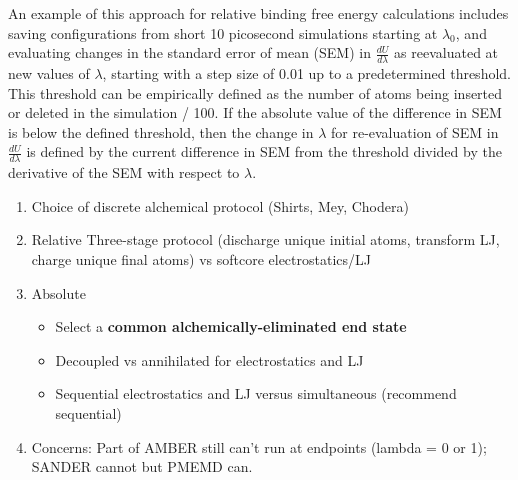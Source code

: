 \documentclass[9pt,bestpractices]{livecoms}
\begin{document}
An example of this approach for relative binding free energy calculations includes saving configurations from short 10 picosecond simulations starting at $\lambda_0$, and evaluating changes in the standard error of mean (SEM) in $\frac{dU}{d\lambda}$ as reevaluated at new values of $\lambda$, starting with a step size of 0.01 up to a predetermined threshold.
This threshold can be empirically defined as the number of atoms being inserted or deleted in the simulation / 100.
If the absolute value of the difference in SEM is below the defined threshold, then the change in $\lambda$ for re-evaluation of SEM in $\frac{dU}{d\lambda}$ is defined by the current difference in SEM from the threshold divided by the derivative of the SEM with respect to $\lambda$.

\begin{enumerate}

\item Choice of discrete alchemical protocol (Shirts, Mey, Chodera)
\item Relative
Three-stage protocol (discharge unique initial atoms, transform LJ, charge unique final atoms) vs softcore electrostatics/LJ

\item Absolute
	\begin{itemize}
	\item Select a \textbf{common alchemically-eliminated end state}
	\item Decoupled vs annihilated for electrostatics and LJ
	\item Sequential electrostatics and LJ versus simultaneous (recommend sequential)

\end{itemize}
\item Concerns:
Part of AMBER still can’t run at endpoints (lambda = 0 or 1); SANDER cannot but PMEMD can.

\end{enumerate}
\end{document}
